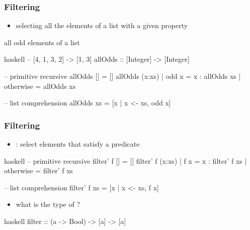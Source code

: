\documentclass[dvipsnames]{beamer}
\theoremstyle{plain}
\begin{document}
\begin{frame}[fragile]
  \frametitle{Filtering}

  \begin{itemize}
    \item selecting all the elements of a list with a given property
  \end{itemize}

  \begin{exampleblock}{all odd elements of a list}
    \begin{pygments}{haskell}
-- [4, 1, 3, 2] -> [1, 3]
allOdds :: [Integer] -> [Integer]

-- primitive recursive
allOdds []     = []
allOdds (x:xs)
  | odd x      = x : allOdds xs
  | otherwise  = allOdds xs

-- list comprehension
allOdds xs = [x | x <- xs, odd x]
    \end{pygments}
  \end{exampleblock}
\end{frame}

\begin{frame}[fragile]
  \frametitle{Filtering}

  \begin{itemize}
    \item {}: select elements that satisfy a predicate
  \end{itemize}

  \begin{exampleblock}{}
    \begin{pygments}{haskell}
-- primitive recursive
filter' f []     = []
filter' f (x:xs)
  | f x       = x : filter' f xs
  | otherwise = filter' f xs

-- list comprehension
filter' f xs = [x | x <- xs, f x]
    \end{pygments}
  \end{exampleblock}

  \pause
  \begin{itemize}
    \item what is the type of ?
  \end{itemize}

  \begin{pygments}{haskell}
filter :: (a -> Bool) -> [a] -> [a]
  \end{pygments}
\end{frame}
\end{document}
